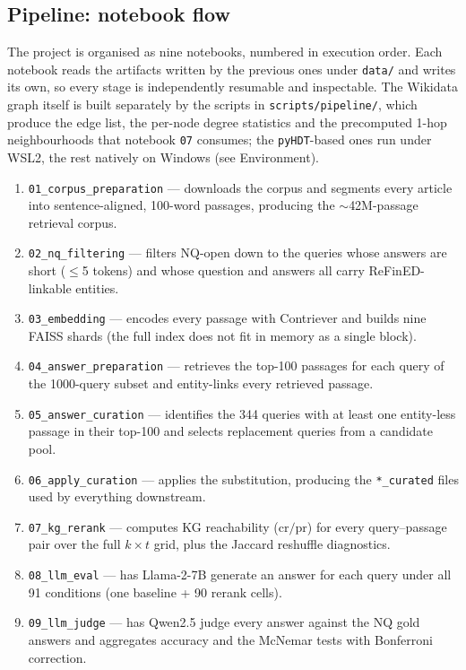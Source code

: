\documentclass{article}
\begin{document}
\subsection*{Pipeline: notebook flow}
The project is organised as nine notebooks, numbered in execution order. Each notebook reads the artifacts written by the previous ones under \texttt{data/} and writes its own, so every stage is independently resumable and inspectable. The Wikidata graph itself is built separately by the scripts in \texttt{scripts/pipeline/}, which produce the edge list, the per-node degree statistics and the precomputed 1-hop neighbourhoods that notebook \texttt{07} consumes; the \texttt{pyHDT}-based ones run under WSL2, the rest natively on Windows (see Environment).
\begin{enumerate}\itemsep 0pt \parskip 0pt
\item \texttt{01\_corpus\_preparation} --- downloads the corpus and segments every article into sentence-aligned, 100-word passages, producing the $\sim$42M-passage retrieval corpus.
\item \texttt{02\_nq\_filtering} --- filters NQ-open down to the queries whose answers are short ($\le$5 tokens) and whose question and answers all carry ReFinED-linkable entities.
\item \texttt{03\_embedding} --- encodes every passage with Contriever and builds nine FAISS shards (the full index does not fit in memory as a single block).
\item \texttt{04\_answer\_preparation} --- retrieves the top-100 passages for each query of the 1000-query subset and entity-links every retrieved passage.
\item \texttt{05\_answer\_curation} --- identifies the 344 queries with at least one entity-less passage in their top-100 and selects replacement queries from a candidate pool.
\item \texttt{06\_apply\_curation} --- applies the substitution, producing the \texttt{*\_curated} files used by everything downstream.
\item \texttt{07\_kg\_rerank} --- computes KG reachability ($\mathrm{cr}/\mathrm{pr}$) for every query--passage pair over the full $k \times t$ grid, plus the Jaccard reshuffle diagnostics.
\item \texttt{08\_llm\_eval} --- has Llama-2-7B generate an answer for each query under all 91 conditions (one baseline + 90 rerank cells).
\item \texttt{09\_llm\_judge} --- has Qwen2.5 judge every answer against the NQ gold answers and aggregates accuracy and the McNemar tests with Bonferroni correction.
\end{enumerate}
\end{document}
